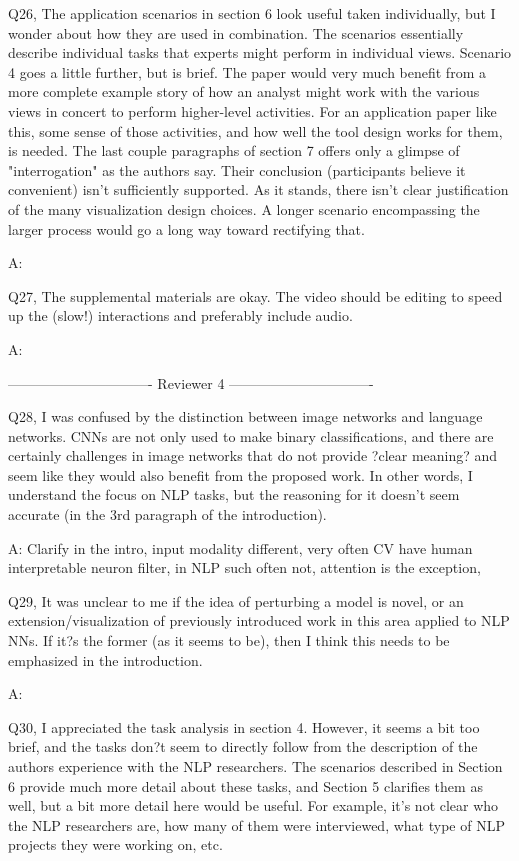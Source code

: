 Q26, The application scenarios in section 6 look useful taken individually, but I wonder about how they are used in combination. The scenarios essentially describe individual tasks that experts might perform in individual views. Scenario 4 goes a little further, but is brief. The paper would very much benefit from a more complete example story of how an analyst might work with the various views in concert to perform higher-level activities. For an application paper like this, some sense of those activities, and how well the tool design works for them, is needed. The last couple paragraphs of section 7 offers only a glimpse of "interrogation" as the authors say.
Their conclusion (participants believe it convenient) isn't sufficiently supported. As it stands, there isn't clear justification of the many visualization design choices. A longer scenario encompassing the larger process would go a long way toward rectifying that.

A:

Q27, The supplemental materials are okay. The video should be editing to speed up the (slow!) interactions and preferably include audio.

A:


------------------------------- Reviewer 4 -------------------------------

Q28, I was confused by the distinction between image networks and language networks. CNNs are not only used to make binary classifications, and there are certainly challenges in image networks that do not provide ?clear meaning? and seem like they would also benefit from the proposed work. In other words, I understand the focus on NLP tasks, but the reasoning for it doesn't seem accurate (in the 3rd paragraph of the introduction).

A: Clarify in the intro, input modality different, very often CV have human interpretable neuron filter, in NLP such often not,   attention is the exception,

Q29, It was unclear to me if the idea of perturbing a model is novel, or an extension/visualization of previously introduced work in this area applied to NLP NNs. If it?s the former (as it seems to be), then I think this needs to be emphasized in the introduction.

A:

Q30, I appreciated the task analysis in section 4. However, it seems a bit too brief, and the tasks don?t seem to directly follow from the description of the authors experience with the NLP researchers. The scenarios described in Section 6 provide much more detail about these tasks, and Section 5 clarifies them as well, but a bit more detail here would be useful. For example, it's not clear who the NLP researchers are, how many of them were interviewed, what type of NLP projects they were working on, etc.

